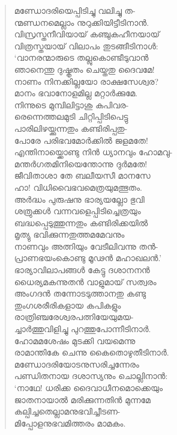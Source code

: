 \begin{verse}
മണ്ഡോദരിയെപ്പിടിച്ചു വലിച്ചു ത-\\
ന്മണ്ഡനമെല്ലാം നുറുക്കിയിട്ടീടിനാന്‍.\\
വിസ്രസ്തനീവിയായ് കഞ്ചുകഹീനയായ്\\
വിത്രസ്തയായ് വിലാപം തുടങ്ങീടിനാള്‍:\\
‘വാനരന്മാരുടെ തല്ലുകൊണ്ടീടുവാന്‍\\
ഞാനെന്തു ദുഷ്കൃതം ചെയ്തതു ദൈവമേ!\\
നാണം നിനക്കില്ലയോ രാക്ഷസേശ്വര?\\
മാനം ഭവാനോളമില്ല മറ്റാര്‍ക്കുമേ.\\
നിന്നുടെ മുമ്പിലിട്ടാശു കപിവര-\\
രെന്നെത്തലമുടി ചിറ്റിപ്പിടിപെട്ടു\\
പാരിലിഴയ്ക്കുന്നതും കണ്ടിരിപ്പതു-\\
പോരേ പരിഭവമോര്‍ക്കില്‍ ജളമതേ!\\
എന്തിനായ്ക്കൊണ്ടു നിന്‍ ധ്യാനവും ഹോമവു-\\
മന്തര്‍ഗതമിനിയെന്തോന്നു ദുര്‍മതേ!\\
ജീവിതാശാ തേ ബലീയസീ മാനസേ\\
ഹാ! വിധിവൈഭവമെത്രയുമത്ഭുതം.\\
അര്‍ദ്ധം പുരുഷനു ഭാര്യയല്ലോ ഭുവി\\
ശത്രുക്കള്‍ വന്നവളെപ്പിടിച്ചെത്രയും\\
ബദ്ധപ്പെടുത്തുന്നതും കണ്ടിരിക്കയില്‍\\
മൃത്യു ഭവിക്കുന്നതുത്തമമേവനും\\
നാണവും അത്നിയും വേടീലിവന്നു തന്‍-\\
പ്രാണഭയംകൊണ്ടു മൂഢന്‍ മഹാഖലന്‍.’\\
ഭാര്യാവിലാപങ്ങള്‍ കേട്ടു ദശാനനന്‍\\
ധൈര്യമകന്നുതന്‍ വാളുമായ് സത്വരം\\
അംഗദന്‍ തന്നോടടുത്താനതു കണ്ടു\\
തുംഗശരീരികളായ കപികളും\\
രാത്രിഞ്ചരേശ്വരപത്നിയേയുമയ-\\
ച്ചാര്‍ത്തുവിളിച്ചു പുറത്തുപോന്നീടിനാര്‍.\\
ഹോമമശേഷം മുടക്കി വയമെന്നു\\
രാമാന്തികേ ചെന്നു കൈതൊഴുതീടിനാര്‍.\\
മണ്ഡോദരിയോടനുസരിച്ചന്നേരം\\
പണ്ഡിതനായ ദശാസ്യനും ചൊല്ലിനാന്‍:\\
‘നാഥേ! ധരിക്ക ദൈവാധീനമൊക്കെയും\\
ജാതനായാല്‍ മരിക്കുന്നതിന്‍ മുന്നമേ\\
കല്പിച്ചതെല്ലാമനുഭവിച്ചീടണ-\\
മിപ്പോളനുഭവമിത്തരം മാമകം.\\

\end{verse}

